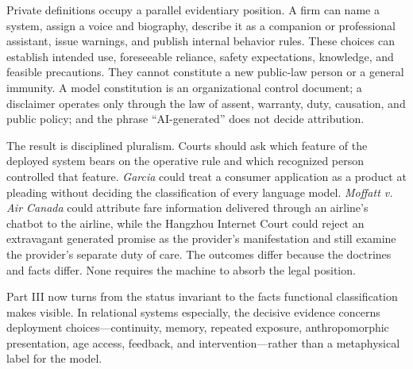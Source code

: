 Private definitions occupy a parallel evidentiary position. A firm can name a system, assign a voice and biography, describe it as a companion or professional assistant, issue warnings, and publish internal behavior rules. These choices can establish intended use, foreseeable reliance, safety expectations, knowledge, and feasible precautions. They cannot constitute a new public-law person or a general immunity. A model constitution is an organizational control document; a disclaimer operates only through the law of assent, warranty, duty, causation, and public policy; and the phrase ``AI-generated'' does not decide attribution.

The result is disciplined pluralism. Courts should ask which feature of the deployed system bears on the operative rule and which recognized person controlled that feature. \emph{Garcia} could treat a consumer application as a product at pleading without deciding the classification of every language model. \emph{Moffatt v. Air Canada} could attribute fare information delivered through an airline's chatbot to the airline, while the Hangzhou Internet Court could reject an extravagant generated promise as the provider's manifestation and still examine the provider's separate duty of care. The outcomes differ because the doctrines and facts differ. None requires the machine to absorb the legal position.

Part III now turns from the status invariant to the facts functional classification makes visible. In relational systems especially, the decisive evidence concerns deployment choices---continuity, memory, repeated exposure, anthropomorphic presentation, age access, feedback, and intervention---rather than a metaphysical label for the model.
